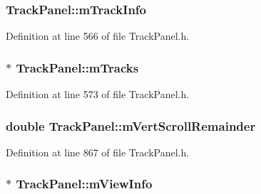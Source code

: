 \subsubsection[{\texorpdfstring{m\+Track\+Info}{mTrackInfo}}]{ Track\+Panel\+::m\+Track\+Info\hspace{0.3cm}{\ttfamily [protected]}}\hypertarget{class_track_panel_a076667fd6be500cff9d6d972afded5e8}{}\label{class_track_panel_a076667fd6be500cff9d6d972afded5e8}


Definition at line 566 of file Track\+Panel.\+h.

\subsubsection[{\texorpdfstring{m\+Tracks}{mTracks}}]{$\ast$ Track\+Panel\+::m\+Tracks\hspace{0.3cm}{\ttfamily [protected]}}\hypertarget{class_track_panel_aea9b67c765754459a262d976a2b5e45e}{}\label{class_track_panel_aea9b67c765754459a262d976a2b5e45e}


Definition at line 573 of file Track\+Panel.\+h.

\subsubsection[{\texorpdfstring{m\+Vert\+Scroll\+Remainder}{mVertScrollRemainder}}]{\setlength{\rightskip}{0pt plus 5cm}double Track\+Panel\+::m\+Vert\+Scroll\+Remainder\hspace{0.3cm}{\ttfamily [protected]}}\hypertarget{class_track_panel_aeac4bbf8f576eeb867f67b0cad4b4168}{}\label{class_track_panel_aeac4bbf8f576eeb867f67b0cad4b4168}


Definition at line 867 of file Track\+Panel.\+h.

\subsubsection[{\texorpdfstring{m\+View\+Info}{mViewInfo}}]{$\ast$ Track\+Panel\+::m\+View\+Info\hspace{0.3cm}{\ttfamily [protected]}}\hypertarget{class_track_panel_afc74f9edb01b0f01155406e69902dcad}{}\label{class_track_panel_afc74f9edb01b0f01155406e69902dcad}


